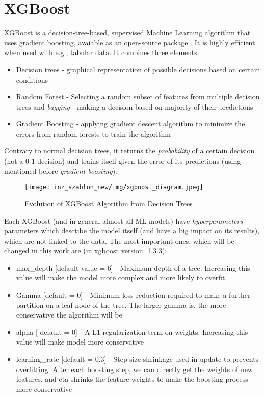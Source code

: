 \section{XGBoost}
XGBoost  is a decision-tree-based, supervised Machine Learning algorithm that uses gradient boosting, avaiable as an open-source package \cite{xgboost}. It is highly efficient when used with e.g., tabular data.\cite{shahid} It combines three elements: 
\begin{itemize}
    \item Decision trees - graphical representation of possible decisions based on certain conditions
    \item Random Forest - Selecting a random subset of features from multiple decision trees and \emph{bagging} - making a decision based on majority of their predictions
    \item Gradient Boosting - applying gradient descent algorithm to minimize the errors from random forests to train the algorithm\cite{xgboost1}\\
\end{itemize}
Contrary to normal decision trees, it returns the \emph{probability} of a certain decision (not a 0-1 decision) and trains itself given the error of its predictions (using mentioned before \emph{gradient boosting}).
\begin{figure}[H]
    \centering
    \texttt{[image: inz\_szablon\_new/img/xgboost\_diagram.jpeg]}
    \caption{Evolution of XGBoost Algorithm from Decision Trees\cite{xgboost1}}
    \label{xgboost diagram}
\end{figure}
Each XGBoost (and in general almost all ML models) have \emph{hyperparameters} - parameters which desctibe the model itself (and have a big impact on its results), which are not linked to the data. The most important ones, which will be changed in this work are (in xgboost version: 1.3.3):
\begin{itemize}
    \item max\_depth [default value = 6] - Maximum depth of a tree. Increasing this value will make the model more complex and more likely to overfit
    \item Gamma [default = 0] - Minimum loss reduction required to make a further partition on a leaf node of the tree. The larger gamma is, the more conservative the algorithm will be
    \item alpha [ default = 0] - A L1 regularization term on weights. Increasing this value will make model more conservative
    \item learning\_rate [default = 0.3] - Step size shrinkage used in update to prevents overfitting. After each boosting step, we can directly get the weights of new features, and eta shrinks the feature weights to make the boosting process more conservative\cite{xgboost-doc}\\
\end{itemize}

